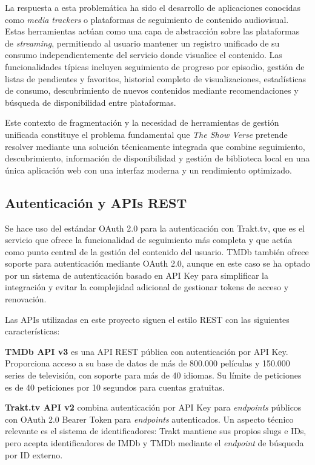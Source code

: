 La respuesta a esta problemática ha sido el desarrollo de aplicaciones conocidas como \textit{media trackers} o plataformas de seguimiento de contenido audiovisual. Estas herramientas actúan como una capa de abstracción sobre las plataformas de \textit{streaming}, permitiendo al usuario mantener un registro unificado de su consumo independientemente del servicio donde visualice el contenido. Las funcionalidades típicas incluyen seguimiento de progreso por episodio, gestión de listas de pendientes y favoritos, historial completo de visualizaciones, estadísticas de consumo, descubrimiento de nuevos contenidos mediante recomendaciones y búsqueda de disponibilidad entre plataformas.

Este contexto de fragmentación y la necesidad de herramientas de gestión unificada constituye el problema fundamental que \textit{The Show Verse} pretende resolver mediante una solución técnicamente integrada que combine seguimiento, descubrimiento, información de disponibilidad y gestión de biblioteca local en una única aplicación web con una interfaz moderna y un rendimiento optimizado.

\subsection{Autenticación y APIs REST}

Se hace uso del estándar OAuth 2.0 \parencite{OWASP:2021} para la autenticación con Trakt.tv, que es el servicio que ofrece la funcionalidad de seguimiento más completa y que actúa como punto central de la gestión del contenido del usuario. TMDb también ofrece soporte para autenticación mediante OAuth 2.0, aunque en este caso se ha optado por un sistema de autenticación basado en API Key para simplificar la integración y evitar la complejidad adicional de gestionar tokens de acceso y renovación.

Las APIs utilizadas en este proyecto siguen el estilo REST con las siguientes características:

\textbf{TMDb API v3} \parencite{TMDb:2024} es una API REST pública con autenticación por API Key. Proporciona acceso a su base de datos de más de 800.000 películas y 150.000 series de televisión, con soporte para más de 40 idiomas. Su límite de peticiones es de 40 peticiones por 10 segundos para cuentas gratuitas.

\textbf{Trakt.tv API v2} \parencite{Trakt:2024} combina autenticación por API Key para \textit{endpoints} públicos con OAuth 2.0 Bearer Token para \textit{endpoints} autenticados. Un aspecto técnico relevante es el sistema de identificadores: Trakt mantiene sus propios slugs e IDs, pero acepta identificadores de IMDb y TMDb mediante el \textit{endpoint} de búsqueda por ID externo.

